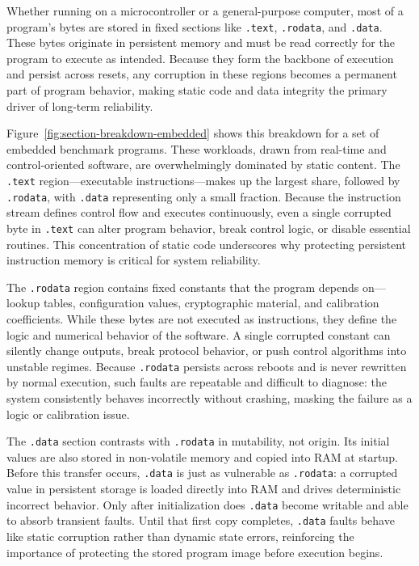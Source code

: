 Whether running on a microcontroller or a general-purpose computer, most of a program’s bytes are stored in fixed sections like \texttt{.text}, \texttt{.rodata}, and \texttt{.data}. These bytes originate in persistent memory and must be read correctly for the program to execute as intended. Because they form the backbone of execution and persist across resets, any corruption in these regions becomes a permanent part of program behavior, making static code and data integrity the primary driver of long-term reliability.

Figure~\ref{fig:section-breakdown-embedded} shows this breakdown for a set of embedded benchmark programs. These workloads, drawn from real-time and control-oriented software, are overwhelmingly dominated by static content. The \texttt{.text} region---executable instructions---makes up the largest share, followed by \texttt{.rodata}, with \texttt{.data} representing only a small fraction. Because the instruction stream defines control flow and executes continuously, even a single corrupted byte in \texttt{.text} can alter program behavior, break control logic, or disable essential routines. This concentration of static code underscores why protecting persistent instruction memory is critical for system reliability.

The \texttt{.rodata} region contains fixed constants that the program depends on---lookup tables, configuration values, cryptographic material, and calibration coefficients. While these bytes are not executed as instructions, they define the logic and numerical behavior of the software. A single corrupted constant can silently change outputs, break protocol behavior, or push control algorithms into unstable regimes. Because \texttt{.rodata} persists across reboots and is never rewritten by normal execution, such faults are repeatable and difficult to diagnose: the system consistently behaves incorrectly without crashing, masking the failure as a logic or calibration issue.

The \texttt{.data} section contrasts with \texttt{.rodata} in mutability, not origin. Its initial values are also stored in non-volatile memory and copied into RAM at startup. Before this transfer occurs, \texttt{.data} is just as vulnerable as \texttt{.rodata}: a corrupted value in persistent storage is loaded directly into RAM and drives deterministic incorrect behavior. Only after initialization does \texttt{.data} become writable and able to absorb transient faults. Until that first copy completes, \texttt{.data} faults behave like static corruption rather than dynamic state errors, reinforcing the importance of protecting the stored program image before execution begins.

